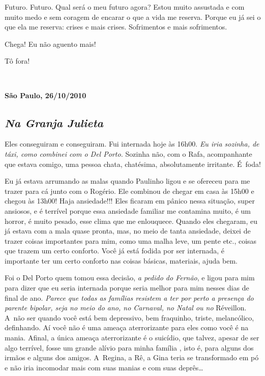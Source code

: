 Futuro. Futuro. Qual será o meu futuro agora? Estou muito assustada e
com muito medo e sem coragem de encarar o que a vida me reserva. Porque
eu já sei o que ela me reserva: crises e mais crises. Sofrimentos e mais
sofrimentos.

Chega! Eu não aguento mais!

Tô fora!

\begin{center}\asterisc{}​\end{center}

\begin{flushright}\textbf{São Paulo, 26/10/2010}\end{flushright}


\subsection{\emph{Na Granja Julieta}}

Eles conseguiram e conseguiram. Fui internada hoje às 16h00. \emph{Eu
iria sozinha, de táxi, como combinei com o Del Porto.} Sozinha não, com
o Rafa, acompanhante que estava comigo, uma pessoa chata, chatésima,
absolutamente irritante. É~foda!

Eu já estava arrumando as malas quando Paulinho ligou e se ofereceu para
me trazer para cá junto com o Rogério. Ele combinou de chegar em casa às
15h00 e chegou às 13h00! Haja ansiedade!!! Eles ficaram em pânico nessa
situação, super ansiosos, e é terrível porque essa ansiedade familiar me
contamina muito, é um horror, é muito pesado, esse clima que me
enlouquece. Quando eles chegaram, eu já estava com a mala quase pronta,
mas, no meio de tanta ansiedade, deixei de trazer coisas importantes
para mim, como uma malha leve, um pente etc., coisas que trazem um certo
conforto. Você já está fodida por ser internada, é importante ter um
certo conforto nas coisas básicas, materiais, ajuda bem.

Foi o Del Porto quem tomou essa decisão, \emph{a pedido do Fernão}, e
ligou para mim para dizer que eu seria internada porque seria melhor
para mim nesses dias de final de ano. \emph{Parece que todas as famílias
resistem a ter por perto a presença do parente bipolar, seja no meio do
ano, no Carnaval, no Natal ou no}\textbf{} Réveillon. A~não ser quando
você está bem depressivo, bem fraquinho, triste, melancólico,
definhando. Aí você não é uma ameaça aterrorizante para eles como você é
na mania. Afinal, a única ameaça aterrorizante é o suicídio, que talvez,
apesar de ser algo terrível, fosse um grande alívio para minha família ,
isto é, para alguns dos irmãos e alguns dos amigos. A~Regina, a Rê, a
Gina teria se transformado em pó e não iria incomodar mais com suas
manias e com suas deprês…

